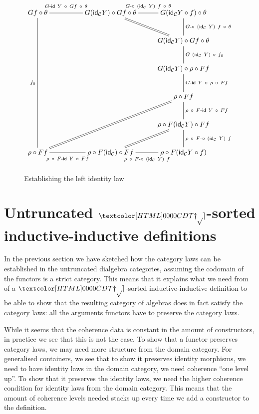 \begin{figure}
  \centering
  $$
\xymatrix@!C@!R{
G f \circ \theta %
\ar@{-}[r]^-*+{\labelstyle \Gid\ Y\ \circ\ Gf\ \circ\ \theta}
\ar@{-}[ddddd]_-{f_0}
&
G (\id_{\Cc} Y) \circ Gf \circ \theta %
\ar@{-}[r]^-*+{\labelstyle \Gcomp\ (\id_{\Cc}\ Y)\ f\ \circ\ \theta}
\ar@{=}[rd]
&G (\id_{\Cc} Y \circ f) \circ \theta %
\ar@{-}[d]^-{\Gcomp\ (\id_{\Cc}\ Y)\ f\ \circ\ \theta}
\\
&&G (\id_{\Cc} Y) \circ Gf \circ \theta %
\ar@{-}[d]^-{G\ (\id_{\Cc}\ Y)\ \circ\ f_0}
\\
&&G (\id_{\Cc} Y) \circ \rho \circ Ff %
\ar@{-}[d]^-{\Gid\ Y\ \circ\ \rho\ \circ\ Ff}
\\
&&\rho \circ Ff %
\ar@{-}[d]^-{\rho\ \circ\ \Fid\ Y\ \circ\ Ff}
\\
&&\rho \circ F (\id_{\Cc} Y) \circ Ff %
\ar@{-}[d]^-{\rho\ \circ\ \Fcomp\ (\id_{\Cc}\ Y)\ f}
\\
\rho \circ Ff %
\ar@{-}[r]_-*+{\labelstyle \rho\ \circ\ \Fid\ Y\ \circ\ Ff}
\ar@{=}[uurr]
&\rho \circ F (\id_{\Cc}) \circ Ff %
\ar@{-}[r]_-*+{\labelstyle \rho\ \circ\ \Fcomp\ (\id_{\Cc}\ Y)\ f}
\ar@{=}[ur]
&\rho \circ F (\id_{\Cc} Y \circ f) %
}
$$

\caption{Establishing the left identity law}
\label{left-identity-calculation}
\end{figure}

\section{Untruncated $\TYPE$-sorted inductive-inductive definitions}

In the previous section we have sketched how the category laws can be
established in the untruncated dialgebra categories, assuming the
codomain of the functors is a strict category. This means that it
explains what we need from of a $\TYPE$-sorted inductive-inductive
definition to be able to show that the resulting category of algebras
does in fact satisfy the category laws: all the arguments functors
have to preserve the category laws.

While it seems that the coherence data is constant in the amount of
constructors, in practice we see that this is not the case. To show
that a functor preserves category laws, we may need more structure
from the domain category. For generalised containers, we see that to
show it preserves identity morphisms, we need to have identity laws in
the domain category, \ie we need coherence ``one level up''. To show
that it preserves the identity laws, we need the higher coherence
condition for identity laws from the domain category. This means that
the amount of coherence levels needed stacks up every time we add a
constructor to the definition.

